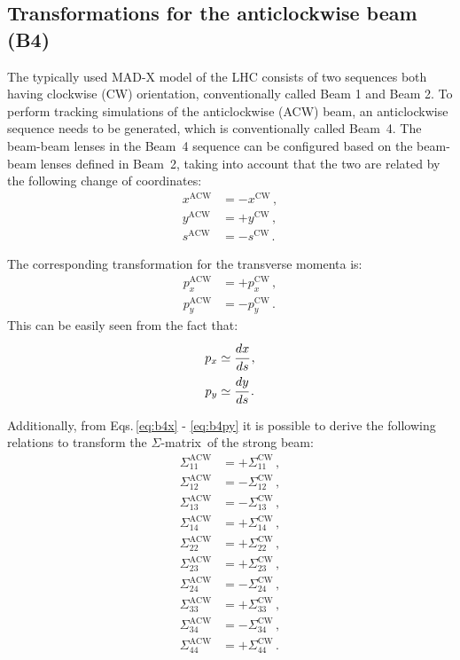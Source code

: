 \subsection{Transformations for the anticlockwise beam (B4)}
\label{sec:b4}

The typically used MAD-X model of the LHC consists of two sequences both having clockwise (CW) orientation, conventionally called Beam 1 and Beam 2. To perform tracking simulations of the anticlockwise (ACW) beam, an anticlockwise sequence needs to be generated, which is conventionally called Beam~4. The beam-beam lenses in the Beam~4 sequence can be configured based on the beam-beam lenses defined in Beam~2, taking into account that the two are related by the following change of coordinates:
\begin{align}
    x^\text{ACW} &= -x^\text{CW} \, , \label{eq:b4x}\\
    y^\text{ACW} &= +y^\text{CW} \, , \\
    s^\text{ACW} &= -s^\text{CW} \, .
\end{align}

The corresponding transformation for the transverse momenta is:
\begin{align}
    p_x^\text{ACW} &= +p_x^\text{CW} \, ,\\
    p_y^\text{ACW} &= -p_y^\text{CW} \, .\label{eq:b4py}
\end{align}
This can be easily seen from the fact that:
\begin{align}
    p_x &\simeq \cfrac{dx}{ds} \, ,\\
    p_y &\simeq \cfrac{dy}{ds} \, .
\end{align}

Additionally, from Eqs.\,\eqref{eq:b4x} - \eqref{eq:b4py} it is possible to derive the following relations to transform the $\Sigma$-matrix\,\cite{bb6dnote} of the strong beam:
\begin{align}
    \Sigma_{11}^\text{ACW} &= +\Sigma_{11}^\text{CW} \, ,\\
    \Sigma_{12}^\text{ACW} &= -\Sigma_{12}^\text{CW} \, ,\\
    \Sigma_{13}^\text{ACW} &= -\Sigma_{13}^\text{CW} \, ,\\
    \Sigma_{14}^\text{ACW} &= +\Sigma_{14}^\text{CW} \, ,\\
    \Sigma_{22}^\text{ACW} &= +\Sigma_{22}^\text{CW} \, ,\\
    \Sigma_{23}^\text{ACW} &= +\Sigma_{23}^\text{CW} \, ,\\
    \Sigma_{24}^\text{ACW} &= -\Sigma_{24}^\text{CW} \, ,\\
    \Sigma_{33}^\text{ACW} &= +\Sigma_{33}^\text{CW} \, ,\\
    \Sigma_{34}^\text{ACW} &= -\Sigma_{34}^\text{CW} \, ,\\
    \Sigma_{44}^\text{ACW} &= +\Sigma_{44}^\text{CW} \, .\\
\end{align}

